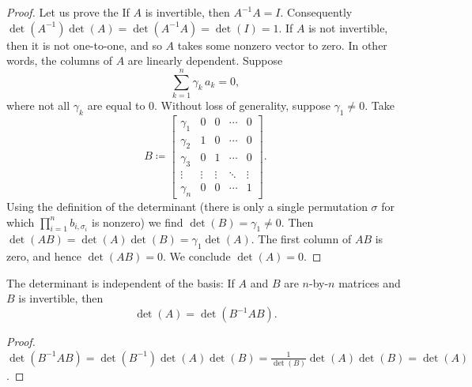 \begin{proof}
Let us prove the
If $A$ is invertible,
then $A^{-1}A = I$.
Consequently $\det(A^{-1})\det(A) = \det(A^{-1}A) = \det(I) = 1$.
If $A$ is not invertible, then it is not one-to-one, and so $A$ takes
some nonzero vector to zero.
In other words, the columns of $A$ are linearly dependent.
Suppose 
\begin{equation*}
\sum_{k=1}^n \gamma_k\, a_k = 0 ,
\end{equation*}
where not all $\gamma_k$ are equal to 0.
Without loss of generality, suppose $\gamma_1\neq 0$.
Take
\begin{equation*}
B \coloneqq 
\begin{bmatrix}
\gamma_1 & 0 & 0 & \cdots & 0 \\
\gamma_2 & 1 & 0 & \cdots & 0 \\
\gamma_3 & 0 & 1 & \cdots & 0 \\
\vdots & \vdots & \vdots & \ddots & \vdots \\
\gamma_n & 0 & 0 & \cdots & 1
\end{bmatrix} .
\end{equation*}
Using the definition of the determinant (there is only a single
permutation $\sigma$ for which $\prod_{i=1}^n b_{i,\sigma_i}$ is nonzero)
we find $\det(B) = \gamma_1 \neq 0$.
Then
$\det(AB) = \det(A)\det(B) = \gamma_1\det(A)$.
The first column of $AB$ is zero, and hence $\det(AB) = 0$.  We conclude
$\det(A) = 0$.
\end{proof}

\begin{prop}
The determinant is independent of the basis:  If $A$ and $B$ are
$n$-by-$n$ matrices and $B$ is
invertible, then
\begin{equation*}
\det(A) = \det(B^{-1}AB) .
\end{equation*}
\end{prop}

\begin{proof}
$\det(B^{-1}AB) = 
\det(B^{-1})\det(A)\det(B) =
\frac{1}{\det(B)}\det(A)\det(B) = \det(A)$.
\end{proof}

